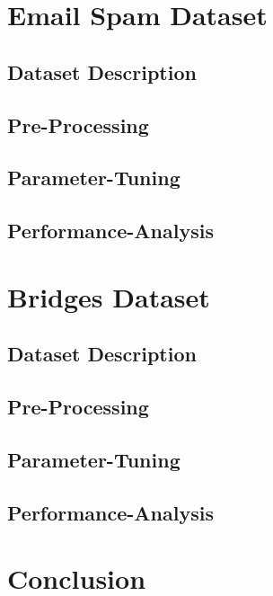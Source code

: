 \documentclass[11pt]{article}
\begin{document}
\section{Email Spam Dataset}
\subsection{Dataset Description}
\subsection{Pre-Processing}
\subsection{Parameter-Tuning}
\subsection{Performance-Analysis}

\section{Bridges Dataset}
\subsection{Dataset Description}
\subsection{Pre-Processing}
\subsection{Parameter-Tuning}
\subsection{Performance-Analysis}

\section{Conclusion}

\newpage


\end{document}
